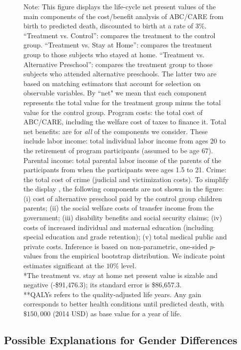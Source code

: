 \begin{figure}
Note: This figure displays the life-cycle net present values of the main components of the cost/benefit analysis of ABC/CARE from birth to predicted death, discounted to birth at a rate of 3\%. ``Treatment vs. Control'': compares the treatment to the control group. ``Treatment vs. Stay at Home'': compares the treatment group to those subjects who stayed at home. ``Treatment vs. Alternative Preschool'': compares the treatment group to those subjects who attended alternative preschools. The latter two are based on matching estimators that account for selection on observable variables. By ``net" we mean that each component represents the total value for the treatment group minus the total value for the control group. Program costs: the total cost of ABC/CARE, including the welfare cost of taxes to finance it. Total net benefits: are for \textit{all} of the components we consider. These include labor income: total individual labor income from ages 20 to the retirement of program participants (assumed to be age 67). Parental income: total parental labor income of the parents of the participants from when the participants were ages 1.5 to 21. Crime: the total cost of crime (judicial and victimization costs). To simplify the display , the following components are not shown in the figure: (i) cost of alternative preschool paid by the control group children parents; (ii) the social welfare costs of transfer income from the government; (iii) disability benefits and social security claims; (iv) costs of increased individual and maternal education (including special education and grade retention); (v) total medical public and private costs. Inference is based on non-parametric, one-sided $p$-values from the empirical bootstrap distribution. We indicate point estimates significant at the $10\%$ level.\\
*The treatment vs. stay at home net present value is sizable and negative (-\$91,476.3); its standard error is \$86,657.3.\\
**QALYs refers to the quality-adjusted life years. Any gain corresponds to better health conditions until predicted death, with $\$150,000$ (2014 USD) as base value for a year of life.\\
\end{figure}

\subsection{Possible Explanations for Gender Differences}


